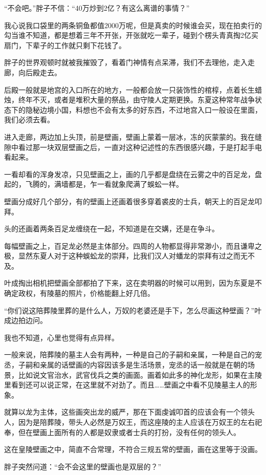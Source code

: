 “不会吧。”胖子不信：“40万炒到2亿？有这么离谱的事情？”

我心说我口袋里的两条铜鱼都值2000万呢，但是真卖的时候谁会买，现在拍卖行的勾当谁不知道，都是想着三年不开张，开张就吃一辈子，碰到个楞头青真掏2亿买扇门，下辈子的工作就只剩下花钱了。

胖子的世界观顿时就被我摧毁了，看着门神情有点呆滞，我们不去理他，走入走廊，向后殿走去。

后殿一般就是地宫的入口所在的地方，一般都会放一只装饰性的棺椁，点着长生蜡烛，终年不灭，或者是堆积大量的祭品，由守陵人定期更换。东夏这种常年战争状态下的隐秘边境小国，料想也不会有太多的好东西，不过地宫入口一般设在里面，我们必须去看。

进入走廊，两边加上头顶，前是壁画，壁画上蒙着一层冰，冻的灰蒙蒙的。我在缝隙中看过那一块双层壁画之后，一直对这种记述性的东西很感兴趣，于是打起手电看起来。

一看却看的浑身发凉，只见壁画之上，画的几乎都是盘绕在云雾之中的百足龙，盘起的，飞腾的，满墙都是，乍一看就象爬满了蜈蚣一样。

壁画分成好几个部分，有的壁画上还画着很多穿着裘皮的士兵，朝天上的百足龙叩拜。

头的还画着两条百足龙缠绕在一起，不知道是在交媾，还是在争斗。

每幅壁画之上，百足龙必然是主体部分。四周的人物都显得非常渺小，而且谦卑之极，显然东夏人对于这种蜈蚣龙的崇拜，比我们汉人对蟠龙的崇拜有过之而无不及。

叶成掏出相机把壁画全部都拍了下来，这在卖明器的时候可以用到，因为东夏是不确定政权，有陵墓的照片，价格能翻上好几倍。

“你们说这陪葬陵里葬的是什么人，万奴的老婆还是手下，怎么尽画这种壁画？”叶成边拍边问。

我也不知道，心里也觉得有点异样。

一般来说，陪葬陵的墓主人会有两种，一种是自己的子嗣和亲属，一种是自己的宠丞，子嗣和亲属的话壁画的内容因该多是生活场景，宠丞的话一般就是在朝的场景，比如说文官治水，武官伐兵之类的画面。画着如此多的神化龙形，如果在主陵里看到还可以说正常，在这里就不对劲了。而且……壁画之中看不见陵墓主人的形象。

就算以龙为主体，这些画突出龙的威严，那在下面虔诚叩首的应该会有一个领头人，因为是陪葬陵，带头人必然是万奴王，而这座陵的主人应该在万奴王的左右祀奉，但在壁画上面所有的人都是奴隶或者士兵的打扮，没有任何的领头人。

这在皇陵壁画之中，简直不合常理，不符合三规五常的壁画，画在这里等于没画。

胖子突然问道：“会不会这里的壁画也是双层的？”

